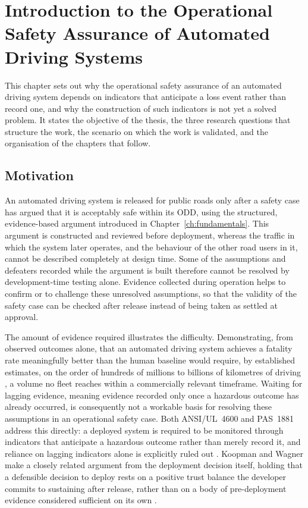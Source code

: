 \chapter[Introduction]{Introduction to the Operational Safety Assurance of Automated Driving Systems}
\label{ch:introduction}

This chapter sets out why the operational safety assurance of an automated driving
system depends on indicators that anticipate a loss event rather than record one, and
why the construction of such indicators is not yet a solved problem. It states the
objective of the thesis, the three research questions that structure the work, the
scenario on which the work is validated, and the organisation of the chapters that
follow.

\section{Motivation}
\label{sec:intro_motivation}

An automated driving system is released for public roads only after a safety case
has argued that it is acceptably safe within its \ac{ODD}, using the structured,
evidence-based argument introduced in Chapter~\ref{ch:fundamentals}. This argument is
constructed and reviewed before deployment, whereas the traffic in which the system
later operates, and the behaviour of the other road users in it, cannot be described
completely at design time. Some of the assumptions and defeaters recorded while the
argument is built therefore cannot be resolved by development-time testing alone.
Evidence collected during operation helps to confirm or to challenge these
unresolved assumptions, so that the validity of the safety case can be checked after
release instead of being taken as settled at approval.

The amount of evidence required illustrates the difficulty. Demonstrating, from observed outcomes alone,
that an automated driving system achieves a fatality rate meaningfully better than the
human baseline would require, by established estimates, on the order of hundreds of
millions to billions of kilometres of driving \cite{kalra2016driving}, a volume no
fleet reaches within a commercially relevant timeframe. Waiting for lagging evidence,
meaning evidence recorded only once a hazardous outcome has already occurred, is
consequently not a workable basis for resolving these assumptions in an operational
safety case. Both ANSI/UL~4600 and PAS~1881 address this directly: a deployed system is
required to be monitored through indicators that anticipate a hazardous outcome rather
than merely record it, and reliance on lagging indicators alone is explicitly ruled out
\cite{ul4600, pas1881}. Koopman and Wagner make a closely related argument from the
deployment decision itself, holding that a defensible decision to deploy rests on a
positive trust balance the developer commits to sustaining after release, rather than
on a body of pre-deployment evidence considered sufficient on its own
\cite{koopman2020positive}.

